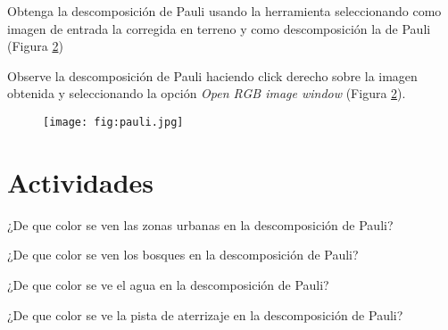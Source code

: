 Obtenga la descomposición de Pauli usando la herramienta  seleccionando como imagen de entrada la corregida en terreno y como descomposición la de Pauli (Figura \ref{fig:pauli})

\begin{figure}[h!]
    \centering
    \hfill
    \caption{}
    \label{fig:pauli}
\end{figure}

Observe la descomposición de Pauli haciendo click derecho sobre la imagen obtenida y seleccionando la opción \emph{Open RGB image window} (Figura \ref{fig:pauli}).

\begin{figure}[h!]
    \centering
    \texttt{[image: fig:pauli.jpg]}
    \caption{}
    \label{fig:pauli}
\end{figure}

\section{Actividades}

\begin{que}
    ¿De que color se ven las zonas urbanas en la descomposición de Pauli?
\end{que}

\begin{que}
    ¿De que color se ven los bosques en la descomposición de Pauli?
\end{que}

\begin{que}
    ¿De que color se ve el agua en la descomposición de Pauli?
\end{que}

\begin{que}
    ¿De que color se ve la pista de aterrizaje en la descomposición de Pauli?
\end{que}
